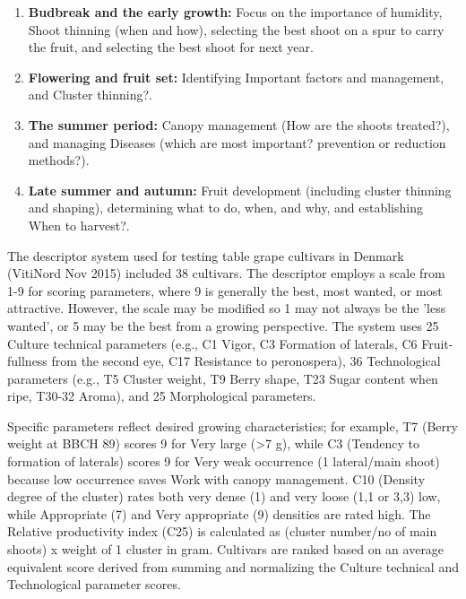 \begin{enumerate} 
    \item \textbf{Budbreak and the early growth:} Focus on the importance of humidity, Shoot thinning (when and how), selecting the best shoot on a spur to carry the fruit, and selecting the best shoot for next year. 
    \item \textbf{Flowering and fruit set:} Identifying Important factors and management, and Cluster thinning?. 
    \item \textbf{The summer period:} Canopy management (How are the shoots treated?), and managing Diseases (which are most important? prevention or reduction methods?). 
    \item \textbf{Late summer and autumn:} Fruit development (including cluster thinning and shaping), determining what to do, when, and why, and establishing When to harvest?. 
\end{enumerate}

\vspace{0.5em}
The descriptor system used for testing table grape cultivars in Denmark (VitiNord Nov 2015) included 38 cultivars. The descriptor employs a scale from 1-9 for scoring parameters, where 9 is generally the best, most wanted, or most attractive. However, the scale may be modified so 1 may not always be the 'less wanted', or 5 may be the best from a growing perspective. The system uses 25 Culture technical parameters (e.g., C1 Vigor, C3 Formation of laterals, C6 Fruit-fullness from the second eye, C17 Resistance to peronospera), 36 Technological parameters (e.g., T5 Cluster weight, T9 Berry shape, T23 Sugar content when ripe, T30-32 Aroma), and 25 Morphological parameters.

\vspace{0.5em}
Specific parameters reflect desired growing characteristics; for example, T7 (Berry weight at BBCH 89) scores 9 for Very large (>7 g), while C3 (Tendency to formation of laterals) scores 9 for Very weak occurrence (1 lateral/main shoot) because low occurrence saves Work with canopy management. C10 (Density degree of the cluster) rates both very dense (1) and very loose (1,1 or 3,3) low, while Appropriate (7) and Very appropriate (9) densities are rated high. The Relative productivity index (C25) is calculated as (cluster number/no of main shoots) x weight of 1 cluster in gram. Cultivars are ranked based on an average equivalent score derived from summing and normalizing the Culture technical and Technological parameter scores.

